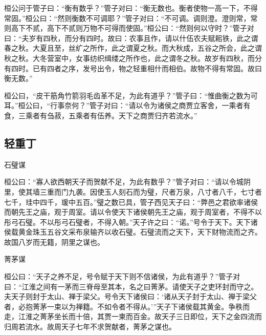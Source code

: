 \documentclass[]{article}
\begin{document}
桓公问于管子曰：``衡有数乎？''管子对曰：``衡无数也。衡者使物一高一下，不得常固。''桓公曰：``然则衡数不可调耶？''管子对曰：``不可调。调则澄。澄则常，常则高下不贰，高下不贰则万物不可得而使固。''桓公曰：``然则何以守时？''管子对曰：``夫岁有四秋，而分有四时。故曰：农事且作，请以什伍农夫赋耜铁，此之谓春之秋。大夏且至，丝纩之所作，此之谓夏之秋。而大秋成，五谷之所会，此之谓秋之秋。大冬营室中，女事纺织缉缕之所作也，此之谓冬之秋。故岁有四秋，而分有四时。已有四者之序，发号出令，物之轻重相什而相伯。故物不得有常固。故曰衡无数。''

桓公曰，``皮干筋角竹箭羽毛齿革不足，为此有道乎？''管子曰：``惟曲衡之数为可耳。''桓公曰，``行事奈何？''管子对曰：``请以令为诸侯之商贾立客舍，一乘者有食，三乘者有刍菽，五乘者有伍养。天下之商贾归齐若流水。''

\hypertarget{header-n1092}{%
\subsection{轻重丁}\label{header-n1092}}

石璧谋

桓公曰：``寡人欲西朝天子而贺献不足，为此有数乎？''管子对曰：``请以令城阴里，使其墙三重而门九袭。因使玉人刻石而为璧，尺者万泉，八寸者八千，七寸者七千，珪中四千，瑗中五百。''璧之数已具，管子西见天子曰：``弊邑之君欲率诸侯而朝先王之庙，观于周室。请以令使天下诸侯朝先王之庙，观于周室者，不得不以彤弓石璧。不以彤弓石璧者，不得入朝。''天子许之曰：``诺。''号令于天下。天下诸侯载黄金珠玉五谷文采布泉输齐以收石璧。石璧流而之天下，天下财物流而之齐。故国八岁而无籍，阴里之谋也。

菁茅谋

桓公曰：``天子之养不足，号令赋于天下则不信诸侯，为此有道乎？''管子对曰：``江淮之间有一茅而三脊母至其本，名之曰菁茅。请使天子之吏环封而守之。夫天子则封于太山、禅于梁父。号令天下诸侯曰：`诸从天子封于太山、禅于梁父者，必抱菁茅一束以为禅籍。不如令者不得从。'''天子下诸侯载其黄金。争秩而走，江淮之菁茅坐长而十倍，其贾一柬而百金。故天子三日即位，天下之金四流而归周若流水。故周天子七年不求贺献者，菁茅之谋也。
\end{document}
